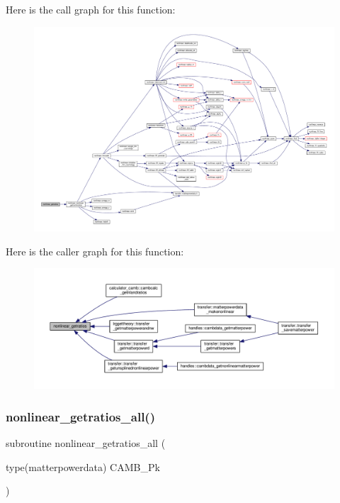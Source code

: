 Here is the call graph for this function\+:
\nopagebreak
\begin{figure}[H]
\begin{center}
\leavevmode
\includegraphics[width=350pt]{halofit__ppf_8f90_aa86a98d6430a2409729002ab053ce60c_cgraph}
\end{center}
\end{figure}
Here is the caller graph for this function\+:
\nopagebreak
\begin{figure}[H]
\begin{center}
\leavevmode
\includegraphics[width=350pt]{halofit__ppf_8f90_aa86a98d6430a2409729002ab053ce60c_icgraph}
\end{center}
\end{figure}
\mbox{\label{halofit__ppf_8f90_a2fbb625d05e4aaceec0f8f5ca560af10}} 
\subsubsection{\texorpdfstring{nonlinear\+\_\+getratios\+\_\+all()}{nonlinear\_getratios\_all()}}
{\footnotesize\ttfamily subroutine nonlinear\+\_\+getratios\+\_\+all (\begin{DoxyParamCaption}\item[{type(matterpowerdata)}]{C\+A\+M\+B\+\_\+\+Pk }\end{DoxyParamCaption})}

